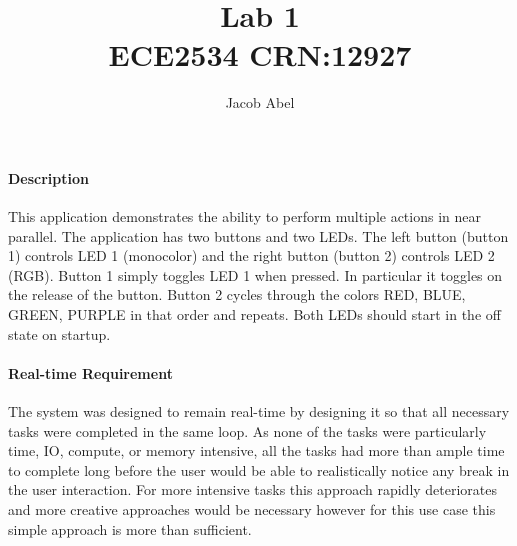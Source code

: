 \documentclass[12pt,letterpaper,notitlepage]{article}
\author{Jacob Abel}
\title{	Lab 1
	\\\large ECE2534 CRN:12927
}
\begin{document}
\maketitle

\begin{raggedright}
\paragraph{Description}

This application demonstrates the ability to perform multiple actions in near parallel. The application has two buttons and two LEDs. The left button (button 1) controls LED 1 (monocolor) and the right button (button 2) controls LED 2 (RGB). Button 1 simply toggles LED 1 when pressed. In particular it toggles on the release of the button. Button 2 cycles through the colors RED, BLUE, GREEN, PURPLE in that order and repeats. Both LEDs should start in the off state on startup.

\paragraph{Real-time Requirement}

The system was designed to remain real-time by designing it so that all necessary tasks were completed in the same loop. As none of the tasks were particularly time, IO, compute, or memory intensive, all the tasks had more than ample time to complete long before the user would be able to realistically notice any break in the user interaction. For more intensive tasks this approach rapidly deteriorates and more creative approaches would be necessary however for this use case this simple approach is more than sufficient.

\end{raggedright}
\end{document}
